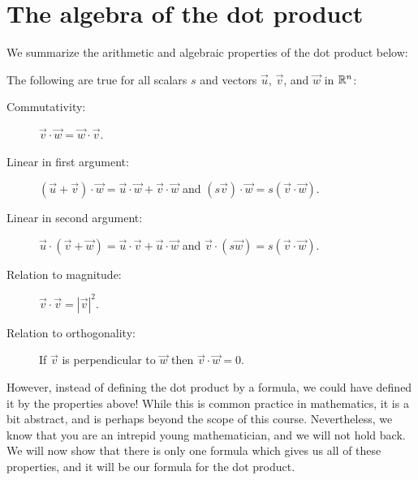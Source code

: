\documentclass{ximera}
\begin{document}
\section{The algebra of the dot product}

We summarize the arithmetic and algebraic properties of the dot
product below:
\begin{theorem}
  The following are true for all scalars $s$ and vectors
  $\vec{u}$, $\vec{v}$, and $\vec{w}$ in $\mathbb R^n$:
  \begin{description}
  \item[Commutativity:] $\vec{v} \cdot \vec{w} = \vec{w} \cdot
    \vec{v}$.
  \item[Linear in first argument:] $(\vec{u}+\vec{v})\cdot \vec{w} = \vec{u}\cdot \vec{w} +
    \vec{v}\cdot \vec{w}$ and $(s\vec{v})\cdot \vec{w} = s(\vec{v}
    \cdot \vec{w})$.
  \item[Linear in second argument:] $\vec{u} \cdot (\vec{v}+\vec{w}) = \vec{u}\cdot \vec{v}+
    \vec{u}\cdot \vec{w}$ and $\vec{v} \cdot (s\vec{w}) = s(\vec{v}
    \cdot \vec{w})$.
  \item[Relation to magnitude:] $\vec{v} \cdot \vec{v} = |\vec{v}|^2$.
  \item[Relation to orthogonality:] If $\vec{v}$ is perpendicular to
    $\vec{w}$ then $\vec{v} \cdot \vec{w} = 0$.
  \end{description}
\end{theorem}

However, instead of defining the dot product by a formula, we could
have defined it by the properties above!  While this is common
practice in mathematics, it is a bit abstract, and is perhaps beyond
the scope of this course. Nevertheless, we know that you are an
intrepid young mathematician, and we will not hold back.  We will now
show that there is only one formula which gives us all of these
properties, and it will be our formula for the dot product.
\end{document}
